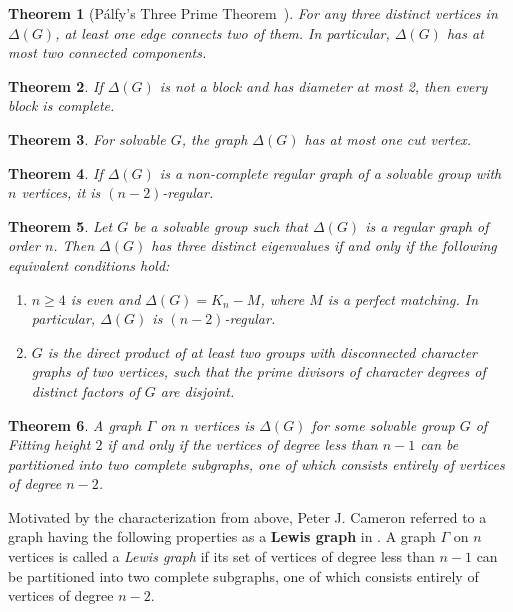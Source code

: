 \documentclass[11pt]{amsart}
\newtheorem{thm}{\bf Theorem}[section]
\begin{document}
\begin{thm}[P\'alfy’s Three Prime Theorem~\cite{Palfy1998}]
For any three distinct vertices in \( \Delta(G) \), at least one edge connects two of them. In particular, \( \Delta(G) \) has at most two connected components.
\end{thm}

\begin{thm}{\cite{Ebrahimi2015}} \label{1.2}
If \( \Delta(G) \) is not a block and has diameter at most 2, then every block is complete.
\end{thm}

\begin{thm}{\cite{LewisMeng2019}} \label{1.3}
For solvable \( G \), the graph \( \Delta(G) \) has at most one cut vertex.
\end{thm}

\begin{thm}{\cite{Zuccari2014}}\label{1.4}
If \( \Delta(G) \) is a non-complete regular graph of a solvable group with \( n \) vertices, it is \( (n-2) \)-regular.
\end{thm}

\begin{thm}{\cite{Hafezieh2021}} \label{1.5}
Let \( G \) be a solvable group such that \( \Delta(G) \) is a regular graph of order \( n \). Then \( \Delta(G) \) has three distinct eigenvalues if and only if the following equivalent conditions hold:
\begin{enumerate}[label=(\roman*)]
    \item \( n \geq 4 \) is even and \( \Delta(G) = K_n - M \), where \( M \) is a perfect matching. In particular, \( \Delta(G) \) is \( (n - 2) \)-regular.
    \item \( G \) is the direct product of at least two groups with disconnected character graphs of two vertices, such that the prime divisors of character degrees of distinct factors of \( G \) are disjoint.
\end{enumerate}
\end{thm}

\begin{thm}{\cite{Lewis2006}}\label{1.6}
A graph \( \Gamma \) on \( n \) vertices is \( \Delta(G) \) for some solvable group \( G \) of Fitting height \(2\) if and only if the vertices of degree less than \( n-1 \) can be partitioned into two complete subgraphs, one of which consists entirely of vertices of degree \( n-2 \).
\end{thm}

Motivated by the characterization from above, Peter J. Cameron referred to a graph having the following properties as a \textbf{Lewis graph} in \cite{Cameron2025}. A graph \( \Gamma \) on \( n \) vertices is called a \emph{Lewis graph} if its set of vertices of degree less than \( n-1 \) can be partitioned into two complete subgraphs, one of which consists entirely of vertices of degree \( n-2 \).
\end{document}
